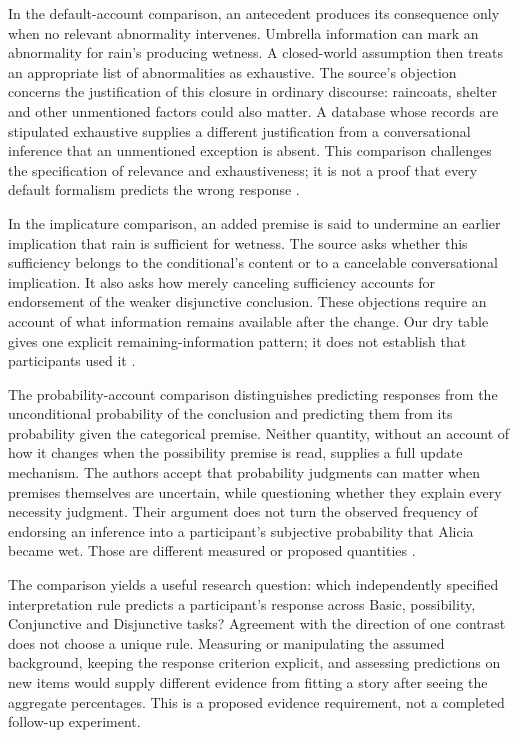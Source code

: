 In the default-account comparison, an antecedent produces its consequence
only when no relevant abnormality intervenes. Umbrella information can mark
an abnormality for rain's producing wetness. A closed-world assumption then
treats an appropriate list of abnormalities as exhaustive. The source's
objection concerns the justification of this closure in ordinary discourse:
raincoats, shelter and other unmentioned factors could also matter. A database
whose records are stipulated exhaustive supplies a different justification
from a conversational inference that an unmentioned exception is absent.
This comparison challenges the specification of relevance and exhaustiveness;
it is not a proof that every default formalism predicts the wrong response
\cite[Sec.~6.1.2]{CarianiRips2017Suppression}.

In the implicature comparison, an added premise is said to undermine an
earlier implication that rain is sufficient for wetness. The source asks
whether this sufficiency belongs to the conditional's content or to a
cancelable conversational implication. It also asks how merely canceling
sufficiency accounts for endorsement of the weaker disjunctive conclusion.
These objections require an account of what information remains available
after the change. Our dry table gives one explicit remaining-information
pattern; it does not establish that participants used it
\cite[Sec.~6.1.3]{CarianiRips2017Suppression}.

The probability-account comparison distinguishes predicting responses from
the unconditional probability of the conclusion and predicting them from
its probability given the categorical premise. Neither quantity, without
an account of how it changes when the possibility premise is read, supplies
a full update mechanism. The authors accept that probability judgments can
matter when premises themselves are uncertain, while questioning whether
they explain every necessity judgment. Their argument does not turn the
observed frequency of endorsing an inference into a participant's subjective
probability that Alicia became wet. Those are different measured or proposed
quantities \cite[Sec.~6.1.4]{CarianiRips2017Suppression}.

The comparison yields a useful research question: which independently
specified interpretation rule predicts a participant's response across
Basic, possibility, Conjunctive and Disjunctive tasks? Agreement with the
direction of one contrast does not choose a unique rule. Measuring or
manipulating the assumed background, keeping the response criterion explicit,
and assessing predictions on new items would supply different evidence from
fitting a story after seeing the aggregate percentages. This is a proposed
evidence requirement, not a completed follow-up experiment.

